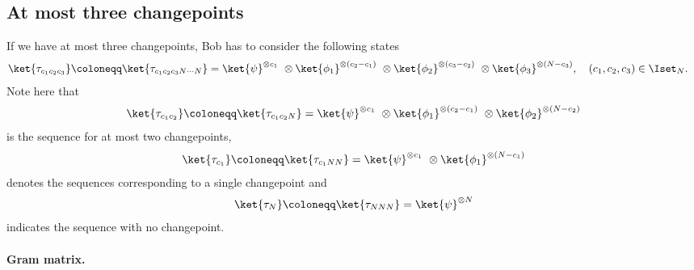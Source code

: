 \begin{appendices}
\section{At most three changepoints}\label{sec:ch3_QSD-3CP}

If we have at most three changepoints, Bob has to consider the following states
\begin{equation}
    \label{eq:ch3_QSD-3CP}
    \begin{aligned}
        \ket{\tau_{c_1 c_2 c_3}} &\coloneqq \ket{\tau_{c_1 c_2 c_3 N \cdots N}} = \ket{\psi}^{\otimes c_1}\ \otimes \ket{\phi_1}^{\otimes (c_2 - c_1)}\ \otimes \ket{\phi_2}^{\otimes (c_3 - c_2)}\ \otimes \ket{\phi_3}^{\otimes (N - c_3)}, \quad (c_1, c_2, c_3) \in \Iset_N.
    \end{aligned}
\end{equation}
Note here that
\begin{align}
    \ket{\tau_{c_1 c_2}} \coloneqq \ket{\tau_{c_1 c_2 N}} = \ket{\psi}^{\otimes c_1}\ \otimes \ket{\phi_1}^{\otimes (c_2 - c_1)}\ \otimes \ket{\phi_2}^{\otimes (N - c_2)}
\end{align}
is the sequence for at most two changepoints,
\begin{align}
    \ket{\tau_{c_1}} \coloneqq \ket{\tau_{c_1 N N}} = \ket{\psi}^{\otimes c_1}\ \otimes \ket{\phi_1}^{\otimes (N - c_1)}
\end{align}
denotes the sequences corresponding to a single changepoint and
\begin{align}
    \ket{\tau_N} \coloneqq \ket{\tau_{N N N}} = \ket{\psi}^{\otimes N} 
\end{align}
indicates the sequence with no changepoint.

\paragraph{Gram matrix.}


\end{appendices}
